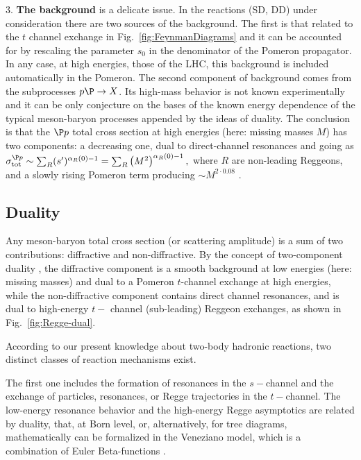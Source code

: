 \documentclass[12pt]{article}
\begin{document}
3. {\bf The background} is a delicate issue. In the reactions (SD, DD) under consideration there are two sources of the background. The first is that related to the $t$ channel exchange in Fig.~\ref{fig:FeynmanDiagrams} and it can be accounted for by rescaling the parameter $s_0$ in the denominator of the Pomeron propagator. In any case, at high energies, those of the LHC, this background is included automatically in the Pomeron. The second component of background comes from the subprocesses $p\P\rightarrow X$. Its high-mass behavior is not known experimentally and it can be only conjecture on the bases of the known energy dependence of the typical meson-baryon processes appended by the ideas of duality. The conclusion is that the $\P p$ total cross section at high energies (here: missing masses $M$) has two components:
 a decreasing one, dual to direct-channel resonances and going as $\sigma_\mathrm{tot}^{\P p}\sim \sum_R(s')^{\alpha_R(0)-1}= \sum_R\left(M^2\right)^{\alpha_R(0)-1},$ where $R$ are non-leading Reggeons, and a slowly rising Pomeron term producing $\sim M^{2\cdot0.08}$ \cite{DL}.
\subsection{Duality} \label{subsec:Duality}
Any meson-baryon total cross section (or scattering amplitude) is a sum of two contributions: diffractive and non-diffractive. By the concept of two-component duality \cite{H_R},
the diffractive component is a smooth background at low energies (here: missing masses) and dual to a Pomeron $t$-channel exchange at high energies, while the non-diffractive
component contains direct channel resonances, and is dual to high-energy $t-$ channel (sub-leading) Reggeon exchanges, as shown in Fig.~\ref{fig:Regge-dual}.

According to our present knowledge about two-body hadronic reactions, two distinct classes of reaction mechanisms exist.

The first one includes the formation of resonances in the $s-$channel
and the exchange of particles, resonances, or Regge
trajectories in the $t-$channel. The low-energy resonance
behavior and the high-energy Regge asymptotics are related by
duality, that, at Born level, or,
alternatively, for tree diagrams, mathematically can be formalized
in the Veneziano model, which is a combination of Euler
Beta-functions \cite{Veneziano}.
\end{document}
